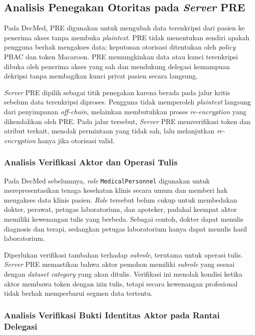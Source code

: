 \documentclass[bahasa, 12pt, a4paper, onecolumn, oneside, final]{report}
\begin{document}
\subsection{Analisis Penegakan Otoritas pada \textit{Server} PRE}
\label{subsec:analisis-penegakan-otoritas-pre}

Pada DecMed, PRE digunakan untuk mengubah data terenkripsi dari pasien ke penerima akses tanpa membuka \textit{plaintext}. PRE tidak menentukan sendiri apakah pengguna berhak mengakses data; keputusan otorisasi ditentukan oleh \textit{policy} PBAC dan token Macaroon. PRE memungkinkan data atau kunci terenkripsi dibuka oleh penerima akses yang sah dan mendukung delegasi kemampuan dekripsi tanpa membagikan kunci privat pasien secara langsung.

\textit{Server} PRE dipilih sebagai titik penegakan karena berada pada jalur kritis sebelum data terenkripsi diproses. Pengguna tidak memperoleh \textit{plaintext} langsung dari penyimpanan \textit{off-chain}, melainkan membutuhkan proses \textit{re-encryption} yang dikendalikan oleh PRE. Pada jalur tersebut, \textit{Server} PRE memverifikasi token dan atribut terkait, menolak permintaan yang tidak sah, lalu melanjutkan \textit{re-encryption} hanya jika otorisasi valid.

\subsubsection{Analisis Verifikasi Aktor dan Operasi Tulis}
\label{subsec:analisis-verifikasi-aktor-operasi-tulis}

Pada DecMed sebelumnya, \textit{role} \texttt{MedicalPersonnel} digunakan untuk merepresentasikan tenaga kesehatan klinis secara umum dan memberi hak mengakses data klinis pasien. \textit{Role} tersebut belum cukup untuk membedakan dokter, perawat, petugas laboratorium, dan apoteker, padahal keempat aktor memiliki kewenangan tulis yang berbeda. Sebagai contoh, dokter dapat menulis diagnosis dan terapi, sedangkan petugas laboratorium hanya dapat menulis hasil laboratorium.

Diperlukan verifikasi tambahan terhadap \textit{subrole}, terutama untuk operasi tulis. \textit{Server} PRE memastikan bahwa aktor pemohon memiliki \textit{subrole} yang sesuai dengan \textit{dataset category} yang akan ditulis. Verifikasi ini menolak kondisi ketika aktor membawa token dengan izin tulis, tetapi secara kewenangan profesional tidak berhak memperbarui segmen data tertentu.

\subsubsection{Analisis Verifikasi Bukti Identitas Aktor pada Rantai Delegasi}
\label{subsec:analisis-verifikasi-bukti-identitas-aktor-aktif}
\end{document}
